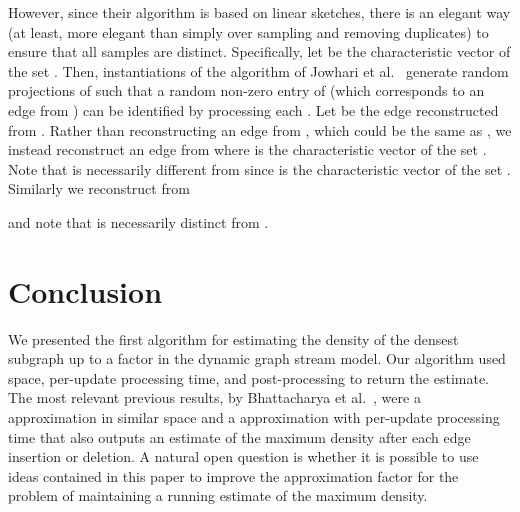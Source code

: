 \documentclass[11pt]{article}
\begin{document}
However, since their algorithm is based on linear sketches, there is an elegant way (at least, more elegant than simply over sampling and removing duplicates) to ensure that all samples are distinct. Specifically, let  be the characteristic vector of the set . Then,  instantiations of the algorithm of Jowhari et al.~\cite{JowhariST11} generate random projections   of  such that a random non-zero entry of  (which corresponds to an edge from ) can be identified by processing each . Let  be the edge reconstructed from . Rather than reconstructing an edge from , which could be the same as , we instead reconstruct an edge  from 
 where  is the characteristic vector of the set . Note that  is necessarily different from  since  is the characteristic vector of the set . Similarly we reconstruct  from 

and note that  is necessarily distinct from .

\section{Conclusion}
We presented the first algorithm for estimating the density of the densest subgraph up to a  factor  in the dynamic graph stream model. Our algorithm used  space,  per-update processing time, and  post-processing to return the estimate. The most relevant previous results, by Bhattacharya et al.~\cite{BhattacharyaHNT15}, were a  approximation in similar space and a  approximation with  per-update processing time that also outputs an estimate of the maximum density after each edge insertion or deletion. A natural open question is whether it is possible to use ideas contained in this paper to improve the approximation factor for the problem of maintaining a running estimate of the maximum density.

{ \small
 
}
\end{document}
